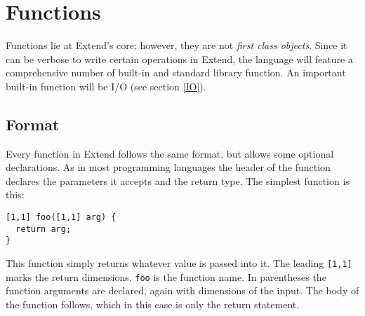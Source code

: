 \section{Functions}
Functions lie at Extend's core; however, they are not \textit{first class objects}. Since it can be verbose to write certain operations in Extend, the language will feature a comprehensive number of built-in and standard library function. An important built-in function will be I/O (see section \ref{IO}).
\subsection{Format}
Every function in Extend follows the same format, but allows some optional declarations. As in most programming languages the header of the function declares the parameters it accepts and the return type. The simplest function is this:
\begin{lstlisting}
[1,1] foo([1,1] arg) {
  return arg;
}
\end{lstlisting}
This function simply returns whatever value is passed into it. The leading \texttt{[1,1]} marks the return dimensions. \texttt{foo} is the function name. In parentheses the function arguments are declared, again with dimensions of the input. The body of the function follows, which in this case is only the return statement.
